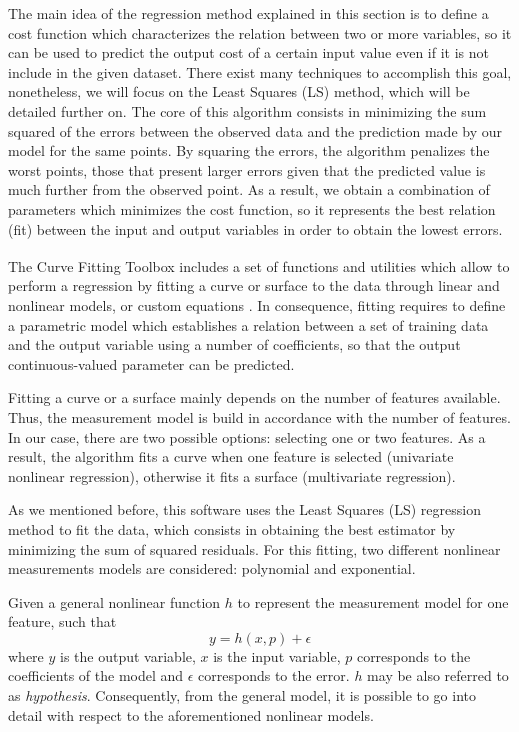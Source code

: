 \documentclass[a4paper, report, oneside, UKenglish]{memoir}
\begin{document}
The main idea of the regression method explained in this section is to define a cost function which characterizes the relation between two or more variables, so it can be used to predict the output cost of a certain input value even if it is not include in the given dataset. There exist many techniques to accomplish this goal, nonetheless, we will focus on the Least Squares (LS) method, which will be detailed further on. The core of this algorithm consists in minimizing the sum squared of the errors between the observed data and the prediction made by our model for the same points. By squaring the errors, the algorithm penalizes the worst points, those that present larger errors given that the predicted value is much further from the observed point. As a result, we obtain a combination of parameters which minimizes the cost function, so it represents the best relation (fit) between the input and output variables in order to obtain the lowest errors. 


The Curve Fitting Toolbox\textsuperscript{\tiny\texttrademark} includes a set of functions and utilities which allow to perform a regression by fitting a curve or surface to the data through linear and nonlinear models, or custom equations \cite{MathWorksRegression}. In consequence, fitting requires to define a parametric model which establishes a relation between a set of training data and the output variable using a number of coefficients, so that the output continuous-valued parameter can be predicted. 

Fitting a curve or a surface mainly depends on the number of features available. Thus, the measurement model is build in accordance with the number of features. In our case, there are two possible options: selecting one or two features. As a result, the algorithm fits a curve when one feature is selected (univariate nonlinear regression), otherwise it fits a surface (multivariate regression).

As we mentioned before, this software uses the Least Squares (LS) regression method to fit the data, which consists in obtaining the best estimator by minimizing the sum of squared residuals. For this fitting, two different nonlinear measurements models are considered: polynomial and exponential. 

Given a general nonlinear function $h$ to represent the measurement model for one feature, such that
\begin{equation}
    y = h(x,p) + \epsilon
\end{equation}
where $y$ is the output variable, $x$ is the input variable, $p$ corresponds to the coefficients of the model and $\epsilon$ corresponds to the error. $h$ may be also referred to as \textit{hypothesis}. Consequently, from the general model, it is possible to go into detail with respect to the aforementioned nonlinear models. 
\end{document}
